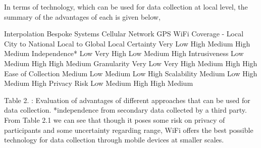 In terms of technology, which can be used for data collection at local level, the summary of the advantages of each is given below,

	Interpolation
	Bespoke Systems
	Cellular Network
	GPS 
	WiFi
	Coverage
	-
	Local
	City to National
	Local to Global
	Local
	Certainty
	Very Low
	High
	Medium
	High
	Medium
	Independence*
	Low
	Very High
	Low
	Medium
	High
	Intrusiveness
	Low
	Medium
	High
	High
	Medium
	Granularity
	Very Low
	Very High
	Medium
	High
	High
	Ease of Collection
	Medium
	Low
	Medium
	Low
	High
	Scalability
	Medium
	Low
	High
	Medium
	High
	Privacy Risk
	Low
	Medium
	High
	High
	Medium

Table 2.
: Evaluation of advantages of different approaches that can be used for data collection.
*independence from secondary data collected by a third party.
From Table 2.1 we can see that though it poses some risk on privacy of participants and some uncertainty regarding range, WiFi offers the best possible technology for data collection through mobile devices at smaller scales.
